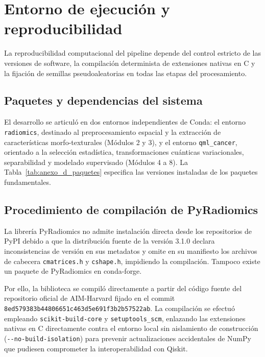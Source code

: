 
\section{Entorno de ejecución y reproducibilidad}\label{anx:entorno}

La reproducibilidad computacional del pipeline depende del control estricto de las versiones
de software, la compilación determinista de extensiones nativas en C y la fijación de semillas
pseudoaleatorias en todas las etapas del procesamiento.

\subsection{Paquetes y dependencias del sistema}

El desarrollo se articuló en dos entornos independientes de Conda: el entorno \texttt{radiomics},
destinado al preprocesamiento espacial y la extracción de características morfo-texturales
(Módulos 2 y 3), y el entorno \texttt{qml\_cancer}, orientado a la selección estadística,
transformaciones cuánticas variacionales, separabilidad y modelado supervisado (Módulos 4 a 8).
La Tabla~\ref{tab:anexo_d_paquetes} especifica las versiones instaladas de los paquetes fundamentales.



\subsection{Procedimiento de compilación de PyRadiomics}

La librería PyRadiomics no admite instalación directa desde los repositorios de PyPI debido a que
la distribución fuente de la versión 3.1.0 declara inconsistencias de versión en sus metadatos y omite
en su manifiesto los archivos de cabecera \texttt{cmatrices.h} y \texttt{cshape.h}, impidiendo la compilación.
Tampoco existe un paquete de PyRadiomics en conda-forge.

Por ello, la biblioteca se compiló directamente a partir del código fuente del repositorio oficial
de AIM-Harvard fijado en el commit \texttt{8ed579383b44806651c463d5e691f3b2b57522ab}. La compilación
se efectuó empleando \texttt{scikit-build-core} y \texttt{setuptools\_scm}, enlazando las extensiones
nativas en C directamente contra el entorno local sin aislamiento de construcción
(\texttt{-\allowbreak-no-\allowbreak build-\allowbreak isolation}) para prevenir actualizaciones accidentales de NumPy que pudiesen comprometer la interoperabilidad con Qiskit.

